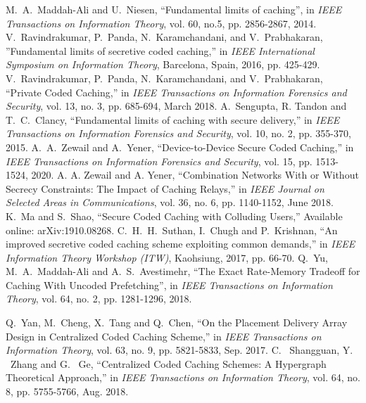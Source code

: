 \documentclass[conference]{IEEEtran}
\begin{document}
\begin{thebibliography}{00}
M.~A.~Maddah-Ali and U.~Niesen, ``Fundamental limits of caching'', in \emph{ IEEE Transactions on Information Theory}, vol. 60, no.5, pp. 2856-2867, 2014.
V.~Ravindrakumar, P.~Panda, N.~Karamchandani, and V.~Prabhakaran, 
''Fundamental limits of secretive coded caching,'' in \emph{IEEE International Symposium on Information Theory}, Barcelona, Spain, 2016, pp. 425-429.
V.~Ravindrakumar, P.~Panda, N.~Karamchandani, and V.~Prabhakaran, 
``Private Coded Caching,'' in \emph{ IEEE Transactions on Information Forensics and Security}, vol. 13, no. 3, pp. 685-694, March 2018.
A.~Sengupta, R. Tandon and T.~C.~Clancy, ``Fundamental limits of caching with secure delivery,'' in \emph{IEEE Transactions on Information Forensics and Security}, vol. 10, no. 2, pp. 355-370, 2015.
A.~A.~Zewail and A.~Yener, ``Device-to-Device Secure Coded Caching,'' in \emph{IEEE Transactions on Information Forensics and Security}, vol. 15, pp. 1513-1524, 2020.
A. A. Zewail and A. Yener, ``Combination Networks With or Without Secrecy Constraints: The Impact of Caching Relays,'' in \emph{IEEE Journal on Selected Areas in Communications}, vol. 36, no. 6, pp. 1140-1152, June 2018.
K.~Ma and S.~Shao, ``Secure Coded Caching with Colluding Users,'' Available online: {arXiv:1910.08268}.
C.~H.~H.~Suthan, I.~Chugh and P.~Krishnan, ``An improved secretive coded caching scheme exploiting common demands,'' in \emph{IEEE Information Theory Workshop (ITW)}, Kaohsiung, 2017, pp. 66-70.
Q.~Yu, M.~A.~Maddah-Ali and A.~S.~Avestimehr, ``The Exact Rate-Memory Tradeoff for Caching With Uncoded Prefetching'', in \emph{IEEE Transactions on Information Theory}, vol. 64, no. 2, pp. 1281-1296, 2018.

Q.~Yan, M.~Cheng, X.~Tang and Q.~Chen, ``On the Placement Delivery Array Design in Centralized Coded Caching Scheme,'' in \emph{IEEE Transactions on Information Theory}, vol. 63, no. 9, pp. 5821-5833, Sep. 2017.
C. ~Shangguan, Y. ~Zhang and G. ~Ge, ``Centralized Coded Caching Schemes: A Hypergraph Theoretical Approach,'' in \emph{IEEE Transactions on Information Theory}, vol. 64, no. 8, pp. 5755-5766, Aug. 2018.


\end{thebibliography}
\end{document}
